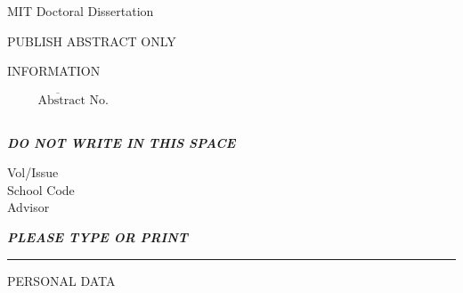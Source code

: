 \documentclass[9pt,twoside]{article}
\begin{document}
\cfoot{}
\renewcommand{\headrulewidth}{0pt}
\centerline{MIT Doctoral Dissertation}
\centerline{PUBLISH ABSTRACT ONLY}
\centerline{INFORMATION}
\hfill $\overline{\phantom{Abstr}\text{Abstract No.}}$ \\
\\
\begin{minipage}{3in}
\begin{center}
\textbf{\emph{DO NOT WRITE IN THIS SPACE}}
\end{center}
Vol/Issue \hrulefill \\
School Code \hrulefill \\
Advisor \hrulefill \\
\end{minipage}
\begin{center}
\textbf{\emph{PLEASE TYPE OR PRINT}}
\end{center}
\vspace*{0.5\baselineskip} \hrule \vspace*{\baselineskip}
PERSONAL DATA \\
\everyTextField{\BC{}}
\newlength{\remaining}
\newlength{\interwidth}
\end{document}
